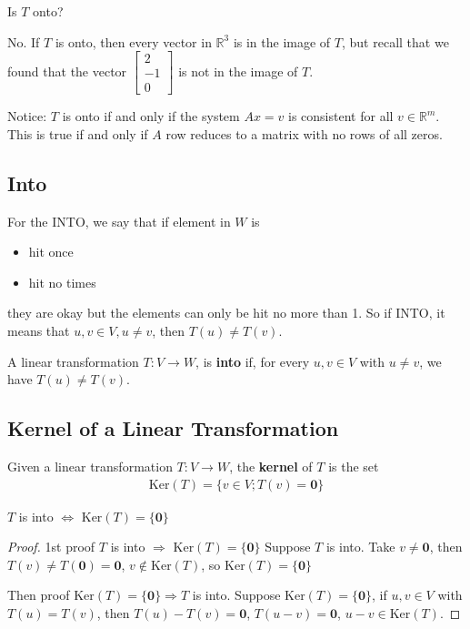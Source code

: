 \documentclass{package/notes}
\begin{document}
Is $T$ onto?

No. If $T$ is onto, then every vector in $\mathbb{R}^3$ is in the image of $T$, but recall that we found that the vector $\left[\begin{array}{c} 2 \\ -1 \\ 0 \end{array} \right]$ is not in the image of $T$.


Notice: $T$ is onto if and only if the system $Ax=v$ is consistent for all $v\in \mathbb{R}^m$. This is true if and only if $A$ row reduces to a matrix with no rows of all zeros.

\subsection{Into}
For the INTO, we say that if element in $W$ is 
\begin{itemize}
    \item hit once
    \item hit no times 
\end{itemize}
they are okay but the elements can only be hit no more than 1. So if INTO, it means that $u,v\in V, u\neq v$, then $T(u)\neq T(v)$.

\begin{definition}[Into]

    A linear transformation $T:V\rightarrow W$, is \textbf{into} if, for every $u,v\in V$ with $u\neq v$, we have $T(u)\neq T(v)$.
\end{definition}


\subsection{Kernel of a Linear Transformation}
\begin{definition}[Kernel]

Given a linear transformation $T: V\rightarrow W$, the \textbf{kernel} of $T$ is the set 
\begin{align*}
    \mathrm{Ker}(T)=\{v\in V; T(v)=\boldsymbol{0}\}
\end{align*}
\end{definition}

\begin{proposition}

$T$ is into $\Leftrightarrow$ $\mathrm{Ker}(T)=\{\boldsymbol{0}\}$
\end{proposition}

\begin{proof}
1st proof $T$ is into $\Rightarrow$ $\mathrm{Ker}(T)=\{\boldsymbol{0}\}$
Suppose $T$ is into. Take $v\neq \boldsymbol{0}$, then $T(v)\neq T(\boldsymbol{0})=\boldsymbol{0}$, $v\notin \mathrm{Ker}(T)$, so $\mathrm{Ker}(T)=\{\boldsymbol{0}\}$

Then proof $\mathrm{Ker}(T)=\{\boldsymbol{0}\}\Rightarrow T$ is into.
Suppose $\mathrm{Ker}(T)=\{\boldsymbol{0}\}$, if $u,v \in V$ with $T(u)=T(v)$, then $T(u)-T(v)=\boldsymbol{0}$, $T(u-v)=\boldsymbol{0}$, $u-v\in \mathrm{Ker}(T)$.
\end{proof}
\end{document}
